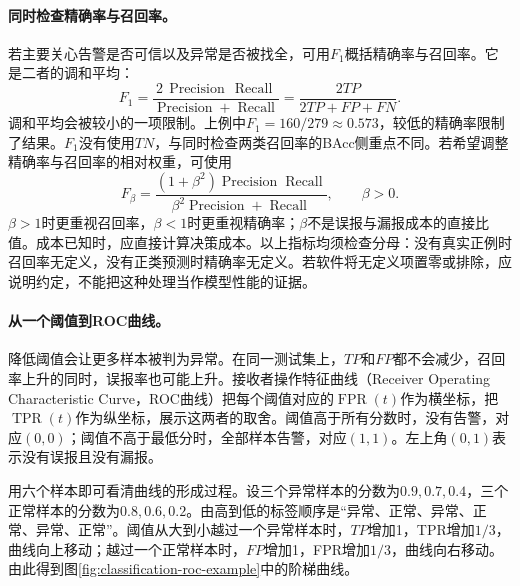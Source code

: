 \paragraph{同时检查精确率与召回率。}
若主要关心告警是否可信以及异常是否被找全，可用$F_1$概括精确率与召回率。它是二者的调和平均：
\begin{equation}
 F_1=\frac{2\,\operatorname{Precision}\,\operatorname{Recall}}
 {\operatorname{Precision}+\operatorname{Recall}}
 =\frac{2TP}{2TP+FP+FN}.
 \label{eq:classification-f1}
\end{equation}
调和平均会被较小的一项限制。上例中$F_1=160/279\approx0.573$，较低的精确率限制了结果。$F_1$没有使用$TN$，与同时检查两类召回率的BAcc侧重点不同。若希望调整精确率与召回率的相对权重，可使用
\begin{equation}
 F_\beta=\frac{(1+\beta^2)\operatorname{Precision}\operatorname{Recall}}
 {\beta^2\operatorname{Precision}+\operatorname{Recall}},\qquad\beta>0.
 \label{eq:classification-fbeta}
\end{equation}
$\beta>1$时更重视召回率，$\beta<1$时更重视精确率；$\beta$不是误报与漏报成本的直接比值。成本已知时，应直接计算决策成本。以上指标均须检查分母：没有真实正例时召回率无定义，没有正类预测时精确率无定义。若软件将无定义项置零或排除，应说明约定，不能把这种处理当作模型性能的证据。

\paragraph{从一个阈值到ROC曲线。}
降低阈值会让更多样本被判为异常。在同一测试集上，$TP$和$FP$都不会减少，召回率上升的同时，误报率也可能上升。接收者操作特征曲线（Receiver Operating Characteristic Curve，ROC曲线）把每个阈值对应的$\operatorname{FPR}(t)$作为横坐标，把$\operatorname{TPR}(t)$作为纵坐标，展示这两者的取舍。阈值高于所有分数时，没有告警，对应$(0,0)$；阈值不高于最低分时，全部样本告警，对应$(1,1)$。左上角$(0,1)$表示没有误报且没有漏报。

用六个样本即可看清曲线的形成过程。设三个异常样本的分数为$0.9,0.7,0.4$，三个正常样本的分数为$0.8,0.6,0.2$。由高到低的标签顺序是“异常、正常、异常、正常、异常、正常”。阈值从大到小越过一个异常样本时，$TP$增加1，TPR增加$1/3$，曲线向上移动；越过一个正常样本时，$FP$增加1，FPR增加$1/3$，曲线向右移动。由此得到图\ref{fig:classification-roc-example}中的阶梯曲线。

